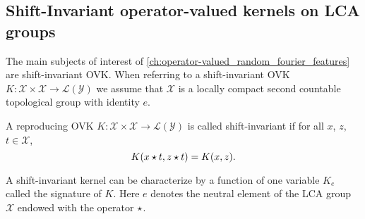 \subsection{Shift-Invariant operator-valued kernels on LCA groups}
The main subjects of interest of
\cref{ch:operator-valued_random_fourier_features} are shift-invariant
\acl{OVK}. When referring to a shift-invariant \ac{OVK}
$K:\mathcal{X}\times\mathcal{X}\to\mathcal{L}(\mathcal{Y})$ we assume that
$\mathcal{X}$ is a locally compact second countable topological group with
identity
$e$.
\begin{definition}
    A reproducing \acl{OVK}
    $K:\mathcal{X}\times\mathcal{X}\to\mathcal{L}(\mathcal{Y})$ is called
    shift-invariant if for all $x$, $z$, $t\in\mathcal{X}$,
    \begin{dmath}
        \label{eq:def_shift_inv}
        K(x\groupop t, z\groupop t) = K(x, z).
    \end{dmath}
\end{definition}
A shift-invariant kernel can be characterize by a function of one variable
$K_e$ called the signature of $K$. Here $e$ denotes the neutral element of the
\ac{LCA} group $\mathcal{X}$ endowed with the operator $\star$.
